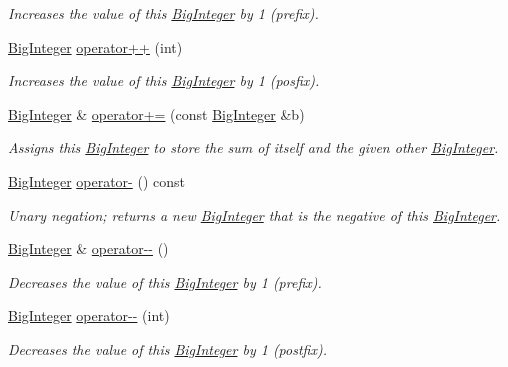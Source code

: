 \begin{DoxyCompactItemize}
\begin{DoxyCompactList}\small\item\em Increases the value of this \mbox{\hyperlink{classBigInteger}{Big\+Integer}} by 1 (prefix). \end{DoxyCompactList}\item 
\mbox{\hyperlink{classBigInteger}{Big\+Integer}} \mbox{\hyperlink{classBigInteger_ae9a012b2622d85e7dcdf5608d17ab0b0}{operator++}} (int)
\begin{DoxyCompactList}\small\item\em Increases the value of this \mbox{\hyperlink{classBigInteger}{Big\+Integer}} by 1 (posfix). \end{DoxyCompactList}\item 
\mbox{\hyperlink{classBigInteger}{Big\+Integer}} \& \mbox{\hyperlink{classBigInteger_ad49a68a043125f9c46eb93122277f86f}{operator+=}} (const \mbox{\hyperlink{classBigInteger}{Big\+Integer}} \&b)
\begin{DoxyCompactList}\small\item\em Assigns this \mbox{\hyperlink{classBigInteger}{Big\+Integer}} to store the sum of itself and the given other \mbox{\hyperlink{classBigInteger}{Big\+Integer}}. \end{DoxyCompactList}\item 
\mbox{\hyperlink{classBigInteger}{Big\+Integer}} \mbox{\hyperlink{classBigInteger_afdae548140cb672a33a3c6bf402ea613}{operator-\/}} () const
\begin{DoxyCompactList}\small\item\em Unary negation; returns a new \mbox{\hyperlink{classBigInteger}{Big\+Integer}} that is the negative of this \mbox{\hyperlink{classBigInteger}{Big\+Integer}}. \end{DoxyCompactList}\item 
\mbox{\hyperlink{classBigInteger}{Big\+Integer}} \& \mbox{\hyperlink{classBigInteger_a8cc5faea7f6f011fbba6cbf31d55a1dd}{operator-\/-\/}} ()
\begin{DoxyCompactList}\small\item\em Decreases the value of this \mbox{\hyperlink{classBigInteger}{Big\+Integer}} by 1 (prefix). \end{DoxyCompactList}\item 
\mbox{\hyperlink{classBigInteger}{Big\+Integer}} \mbox{\hyperlink{classBigInteger_ac74beb1a11a5ad6ab210b8c9101451c8}{operator-\/-\/}} (int)
\begin{DoxyCompactList}\small\item\em Decreases the value of this \mbox{\hyperlink{classBigInteger}{Big\+Integer}} by 1 (postfix). \end{DoxyCompactList}\item 

\end{DoxyCompactItemize}
